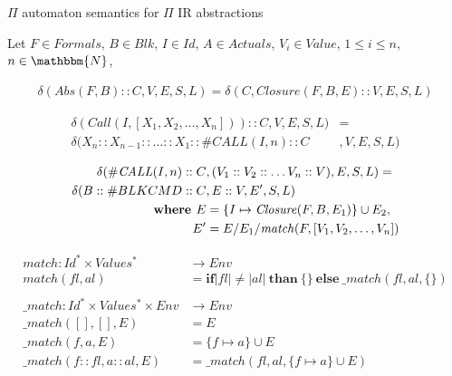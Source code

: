 \documentclass{beamer}
\begin{document}
\begin{frame}{{\color{red}$\Pi$ automaton} semantics for {\color{red}$\Pi$ IR} abstractions}



Let $F \in \mathit{Formals}$, $B \in Blk$, $I \in \mathit{Id}$, $A \in \mathit{Actuals}$, $V_i \in \mathit{Value}$, $1 \le i \le n$, $n \in \mathbbm{N}$,

\begin{small}
\begin{align}
\delta(\mathit{Abs}(F, B) :: C, V, E, S, L) = \delta(C, \mathit{Closure}(F, B, E) :: V, E, S, L) 
\end{align}

\begin{align}
\delta(\mathit{Call}(I, [X_1, X_2, \ldots, X_n])) :: C, V, E, S, L) & = \\ \nonumber 
\delta(X_n :: X_{n-1} :: \ldots :: X_1 :: \#\mathit{CALL}(I, n) :: C&, V, E, S, L) 
\end{align}

\begin{align}
\delta(\#\mathit{CALL}(I, n) ::C&, (V_1 :: V_2 :: \ldots V_n :: V), E, S, L) = \\ \nonumber
	\delta(B :: \#BLKCMD :: C&, E :: V, E', S, L) \\ \nonumber
\text{\bf where } E &= \{I \mapsto \mathit{Closure}(F, B, E_1)\} \cup E_2,  \\  \nonumber
E' & = E / E_1 / \mathit{match}(F,  [V_1, V_2, \ldots, V_n]) 
\end{align}

\begin{align*}	
\mathit{match} : \mathit{Id^*} \times \mathit{Values^*} & \to \mathit{Env} \\ 
\mathit{match}(fl, al) & = \mathbf{if} |fl| \not= |al| \ \mathbf{than} \ \{\} \ \mathbf{else} \ \_\mathit{match}(fl, al, \{\}) \\ \\
\_\mathit{match} : \mathit{Id^*} \times \mathit{Values^* } \times \mathit{Env} & \to \mathit{Env} \\ 
\_\mathit{match}([], [], E) & = E \\
\_\mathit{match}(f, a, E)  & = \{f \mapsto a\} \cup E \\
\_\mathit{match}(f :: fl, a :: al, E) & = \_\mathit{match}(fl, al, \{f \mapsto a\} \cup E) 
\end{align*}
\end{small}

\end{frame}
\end{document}

